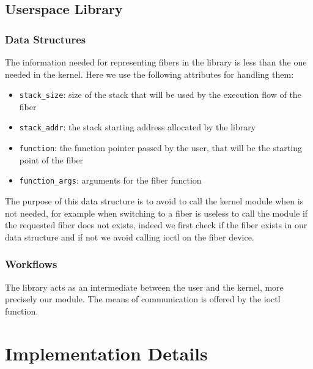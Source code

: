 \documentclass[a4paper,10pt]{article}
\begin{document}
\subsection{Userspace Library}

\subsubsection{Data Structures}
  The information needed for representing fibers in the library is less than the one needed in the kernel. Here we use the following attributes for handling them:
  \begin{itemize}
    \item \lstinline{stack_size}: size of the stack that will be used by the execution flow of the fiber
    \item \lstinline{stack_addr}: the stack starting address allocated by the library
    \item \lstinline[language={}]{function}: the function pointer passed by the user, that will be the starting point of the fiber
    \item \lstinline{function_args}: arguments for the fiber function
  \end{itemize}

  The purpose of this data structure is to avoid to call the kernel module when is not needed, for example when switching to a fiber is useless to call the module if the requested fiber does not exists, indeed we first check if the fiber exists in our data structure and if not we avoid calling ioctl on the fiber device.

\subsubsection{Workflows}\label{subsubsec:lib-works}
  The library acts as an intermediate between the user and the kernel, more precisely our module. The means of communication is offered by the ioctl function.

\section{Implementation Details}
\end{document}
